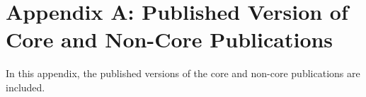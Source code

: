 \newpage
\chapter{Appendix A: Published Version of Core and Non-Core Publications}
In this appendix, the published versions of the core and non-core publications are included. 
\cleardoublepage
{}
{}


\cleardoublepage
{}
{}
